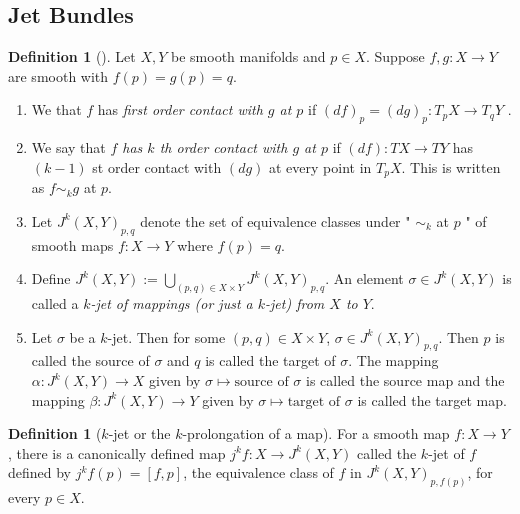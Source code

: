 \documentclass[reqno]{amsart}
\theoremstyle{definition}
\newtheorem{definition}[theorem]{Definition}
\theoremstyle{remark}
\begin{document}
\subsection{Jet Bundles}

\begin{definition}[]
   Let $X,Y$ be smooth manifolds and $p \in X$. 
   Suppose $f,g \colon X \to Y$ are smooth
   with $f(p) = g(p) = q$.
   \begin{enumerate}
       \item We that $f$ has \textit{first order contact
           with $g$ at $p$ } if $\left( df \right)_p
           = \left( dg \right)_p \colon
           T_p X \to T_q Y$ .
       \item We say that \textit{$f$ has $k$ th order
           contact with $g$ at $p$} if
           $\left( df \right) \colon
           TX \to TY$ has $\left( k-1 \right) $ st
           order contact with $\left( dg \right) $ at
           every point in $T_p X$. This is written
           as $f \sim_k g$ at $p$.
       \item Let $J^{k}(X,Y)_{p,q}$ denote the
           set of equivalence classes under
           " $\sim_k$ at $p$ " of smooth maps
           $f \colon X \to Y$ where
           $f(p) = q$.
       \item Define $J^{k}(X,Y) :=
           \bigcup_{\left( p,q \right) \in X \times Y} 
           J^{k}(X,Y)_{p,q}$. An element
           $\sigma \in J^{k}(X,Y)$ is called a 
           \textit{$k$-jet of mappings (or just a $k$-jet)
           from $X$ to $Y$}.
       \item Let $\sigma$ be a $k$-jet. Then
           for some $\left( p,q \right) \in X \times Y$,
           $\sigma \in J^{k}(X,Y)_{p,q}$. Then
           $p$ is called the source of $\sigma$ and
           $q$ is called the target of $\sigma$. The
           mapping $\alpha \colon J^{k}(X,Y) \to X$ 
           given by $\sigma \mapsto \text{source of } \sigma$ 
           is called the source map and the mapping
           $\beta \colon J^{k}(X,Y) \to Y$ given by
           $\sigma \mapsto \text{target of }\sigma$ is called
           the target map.
   \end{enumerate}
\end{definition}

\begin{definition}[$k$-jet or the $k$-prolongation of a map]
    For a smooth map
    $f \colon X \to Y$, there is a canonically defined map
    $j^{k}f \colon X \to J^{k}(X,Y)$ called the
    $k$-jet of $f$ defined by
    $j^{k}f(p) = \left[ f, p \right] $, the
    equivalence class of $f$ in
    $J^{k}(X,Y)_{p, f(p)}$, for every
    $p \in X$.
\end{definition}
\end{document}

